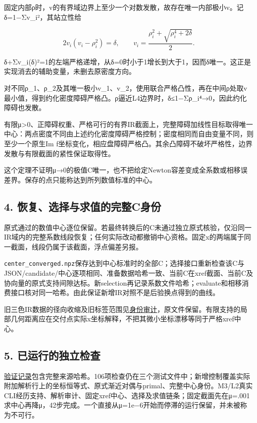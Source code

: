 \documentclass[
  10pt,
  a4paper,
]{article}
\begin{document}
固定内部ρ时，v的有界域边界上至少一个对数发散，故存在唯一内部极小v。记δ=1−Σv\_i²，其站立性给

\[
 2v_i(v_i-\rho_i^2)=\delta,\qquad
 v_i=\frac{\rho_i^2+\sqrt{\rho_i^4+2\delta}}2.
\]

δ+Σv\_i(δ)²=1的左端严格递增，从δ=0时小于1增长到大于1，因而δ唯一。这正是实现消去的辅助变量，未删去原密度方向。

对不同ρ\_1、ρ\_2及其唯一极小v\_1、v\_2，使用联合严格凸性，再在中间ρ处取v最小值，得到约化密度障碍严格凸。ρ逼近L4边界时，δ≤1−Σρ\_i⁴→0，因此约化障碍也发散。

有限μ\textgreater0、正障碍权重、严格可行的有界IR截面上，完整障碍加线性目标取得唯一中心：两点密度不同由上述约化密度障碍严格控制；密度相同而自由变量不同，则至少一个原生Im
f坐标变化，相应盘障碍严格凸。其余凸障碍不破坏严格性，边界发散与有限截面的紧性保证取得性。

这个定理不证明μ→0的极值C唯一，也不把给定Newton容差变成全系数或相移误差界。保存的点只能称达到所列数值标准的中心。

\subsection{4.
恢复、选择与求值的完整C身份}\label{ux6062ux590dux9009ux62e9ux4e0eux6c42ux503cux7684ux5b8cux6574cux8eabux4efd}

原式通过的数值中心逐位保留。若最终转换后的C未通过独立原式核验，仅沿同一IR域内的完整系数线段恢复；任何实际改动都撤销中心资格。固定x的两端属于同一截面，线段仍属于该截面，浮点偏差另报。

\texttt{center\_converged.npz}保存达到中心标准时的全部C；选择接口重新检查该C与JSON/candidate/中心逐项相同、准备数据哈希一致、当前C在xref截面、当前C及协向量的原式支持间隙达标。新selection再记录系数文件哈希；evaluate和相移消费接口核对同一哈希。由此保证新增IR对照不是后验换点得到的曲线。

旧三色IR数据的径向收缩及旧标签范围见\href{../IR_CENTER_IDENTITY_REVIEW_ZH.md}{身份审计}，原文件保留。有限支持的局部几何距离应在交付点实际x坐标解释，不把其微小坐标漂移等同于严格xref中心。

\subsection{5.
已运行的独立检查}\label{ux5df2ux8fd0ux884cux7684ux72ecux7acbux68c0ux67e5}

\href{../verification_IR_slice.json}{验证记录}包含完整来源哈希。106项检查仍在三个测试文件中；新增控制覆盖实际附加解析行上的坐标恒等式、原式渐近对偶与primal、完整中心身份。M3/L2真实CLI经历支持、解析审计、固定xref中心、选择及求值链条；固定截面先在μ=.001求中心再降μ，42步完成。一个直接从μ=1e−6开始而停滞的运行保留，并未被称为不可行。
\end{document}
